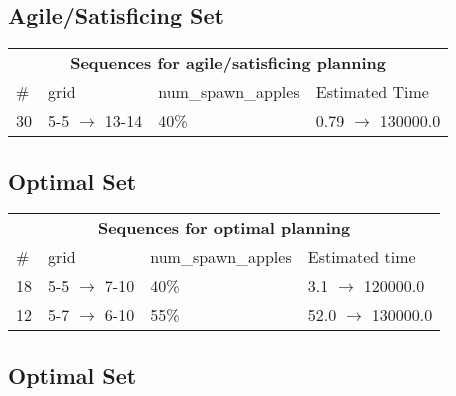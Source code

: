\documentclass{article}
\begin{document}
                         \subsection*{Agile/Satisficing Set}

                        \begin{center}
                        \begin{tabular}{@{}l|l|l|l@{}}
                        \multicolumn{4}{c}{\bf \large Sequences for agile/satisficing planning}\\
                        \# & grid & num\_spawn\_apples & Estimated Time\\\midrule
                        30&5-5 $\rightarrow$ 13-14&40\%&0.79 $\rightarrow$ 130000.0
                        \end{tabular}
                        \end{center}
                    
                            \subsection*{Optimal Set}

                            \begin{center}
                            \begin{tabular}{@{}l|l|l|l@{}}
                            \multicolumn{4}{c}{\bf \large Sequences for optimal planning}\\
                            \# & grid & num\_spawn\_apples & Estimated time\\\midrule
                            18&5-5 $\rightarrow$ 7-10&40\%&3.1 $\rightarrow$ 120000.0\\
12&5-7 $\rightarrow$ 6-10&55\%&52.0 $\rightarrow$ 130000.0
                            \end{tabular}
                            \end{center}
                    
                                \subsection*{Optimal Set}
                                
\end{document}
